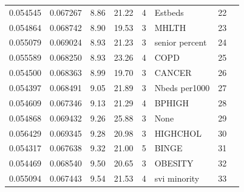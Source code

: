 \documentclass[12pt]{article}
\theoremstyle{definition}
\renewcommand{\_}{%
    \textunderscore\hspace{0pt}%
}
\begin{document}
\begin{table}[p]
{\begin{tabular}{rrrrrlrl}
 0.054545 & 0.067267 & 8.86 & 21.22 & 4 & Estbeds & 22 \\
 0.054864 & 0.068742 & 8.90 & 19.53 & 3 & MHLTH & 23 \\
 0.055079 & 0.069024 & 8.93 & 21.23 & 3 & senior\_percent & 24 \\
 0.055589 & 0.068250 & 8.93 & 23.26 & 4 & COPD & 25 \\
 0.054500 & 0.068363 & 8.99 & 19.70 & 3 & CANCER & 26 \\
 0.054397 & 0.068491 & 9.05 & 21.89 & 3 & Nbeds\_per1000 & 27 \\
 0.054609 & 0.067346 & 9.13 & 21.29 & 4 & BPHIGH & 28 \\
\rowcolor{lightgray}  0.054868 & 0.069432 & 9.26 & 25.88 & 3 & None & 29 \\
 0.056429 & 0.069345 & 9.28 & 20.98 & 3 & HIGHCHOL & 30 \\
 0.054317 & 0.067638 & 9.32 & 21.00 & 5 & BINGE & 31 \\
 0.054469 & 0.068540 & 9.50 & 20.65 & 3 & OBESITY & 32 \\
 0.055094 & 0.067443 & 9.54 & 21.53 & 4 & svi\_minority & 33 \\
\bottomrule
\end{tabular}
}
\end{table}
\end{document}
